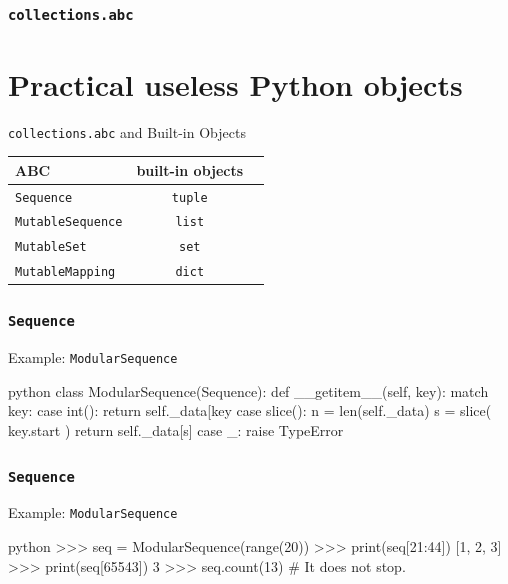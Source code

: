\documentclass[aspectratio=169,dvipdfmx,12pt,notheorems]{beamer}
\theoremstyle{definition}
\begin{document}
\begin{frame}\frametitle{\texttt{collections.abc}}

\section{Practical useless Python objects}

\begin{exampleblock}{\texttt{collections.abc} and Built-in Objects}
\begin{table}[h]
\centering
\begin{tabular}{lcr}
\hline
ABC  & built-in objects \\
\hline
\texttt{Sequence}  & \texttt{tuple} \\
\texttt{MutableSequence}  & \texttt{list} \\
\texttt{MutableSet}  &  \texttt{set} \\
\texttt{MutableMapping}  & \texttt{dict}  \\
\hline
\end{tabular}
\end{table}
\end{exampleblock}

\end{frame}

\begin{frame}[fragile,shrink=4]\frametitle{\texttt{Sequence}}

\begin{exampleblock}{Example: \texttt{ModularSequence}}
\begin{pygments}{python}
class ModularSequence(Sequence):
    def __getitem__(self, key):
        match key:
            case int():
                return self._data[key %
            case slice():
                n = len(self._data)
                s = slice(
                    key.start %
                )
                return self._data[s]
            case _:
                raise TypeError
\end{pygments}
\end{exampleblock}

\end{frame}

\begin{frame}[fragile]\frametitle{\texttt{Sequence}}

\begin{exampleblock}{Example: \texttt{ModularSequence}}
\begin{pygments}{python}
>>> seq = ModularSequence(range(20))
>>> print(seq[21:44])
[1, 2, 3]
>>> print(seq[65543])
3
>>> seq.count(13) # It does not stop.
\end{pygments}
\end{exampleblock}

\end{frame}
\end{document}
